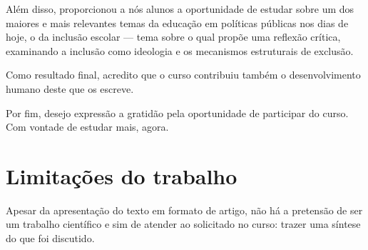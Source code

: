 \documentclass{../../common-shared/cls/Article_Class_RevInfor}
\begin{document}
Além disso, proporcionou a nós alunos a oportunidade de estudar sobre
um dos maiores e mais relevantes temas da educação em políticas
públicas nos dias de hoje, o da inclusão escolar --- tema sobre o qual
 propõe uma reflexão crítica, examinando
a inclusão como ideologia e os mecanismos estruturais de exclusão.

Como resultado final, acredito que o curso contribuiu também o
desenvolvimento humano deste que os escreve.

Por fim, desejo expressão a gratidão pela oportunidade de participar
do curso. Com vontade de estudar mais, agora.

\section{Limitações do trabalho}
Apesar da apresentação do texto em formato de artigo, não há a pretensão de ser um trabalho científico e sim de atender ao solicitado no curso: trazer uma síntese do que foi discutido.

\postextual

\end{document}
